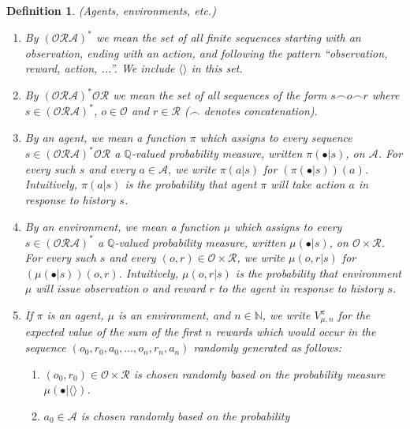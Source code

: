 \documentclass{article}
\newtheorem{definition}[theorem]{Definition}
\begin{document}
\begin{definition}
\label{omnibusdefn}
    (Agents, environments, etc.)
    \begin{enumerate}
        \item
        By $(\mathcal O\mathcal R\mathcal A)^*$ we mean the set of
        all finite sequences starting with an observation, ending with an action,
        and following the pattern ``observation, reward, action, ...''.
        We include $\langle\rangle$ in this set.
        \item
        By $(\mathcal O\mathcal R\mathcal A)^* \mathcal O\mathcal R$
        we mean the set of all sequences of the form $s\frown o\frown r$ where
        $s\in (\mathcal O\mathcal R\mathcal A)^*$, $o\in\mathcal O$
        and $r\in\mathcal R$ ($\frown$ denotes concatenation).
        \item
        By an \emph{agent}, we mean a function $\pi$ which assigns to every sequence
        $s\in (\mathcal O\mathcal R\mathcal A)^* \mathcal O\mathcal R$ a $\mathbb Q$-valued probability measure,
        written $\pi(\bullet|s)$, on $\mathcal A$.
        For every such $s$ and every $a\in\mathcal A$,
        we write $\pi(a|s)$ for $(\pi(\bullet|s))(a)$.
        Intuitively, $\pi(a|s)$ is the probability that agent $\pi$
        will take action $a$ in response to history $s$.
        \item
        By an \emph{environment}, we mean a function $\mu$
        which assigns to every
        $s\in (\mathcal O\mathcal R\mathcal A)^*$
        a $\mathbb Q$-valued probability measure,
        written $\mu(\bullet|s)$,
        on $\mathcal O\times\mathcal R$.
        For every such $s$ and every $(o,r)\in\mathcal O\times\mathcal R$,
        we write $\mu(o,r|s)$ for $(\mu(\bullet|s))(o,r)$.
        Intuitively, $\mu(o,r|s)$ is the probability that environment
        $\mu$ will issue observation $o$ and reward $r$ to the agent in response
        to history $s$.
        \item
        If $\pi$ is an agent, $\mu$ is an environment, and $n\in\mathbb N$,
        we write $V^\pi_{\mu,n}$ for the expected value of the sum of
        the first $n$ rewards which would occur in the sequence
        $(o_0,r_0,a_0,\ldots,o_n,r_n,a_n)$ randomly generated as follows:
        \begin{enumerate}
            \item $(o_0,r_0)\in \mathcal O\times\mathcal R$ is chosen randomly based
            on the probability measure $\mu(\bullet|\langle\rangle)$.
            \item $a_0\in\mathcal A$ is chosen randomly based on the probability

\end{enumerate}
\end{enumerate}
\end{definition}
\end{document}
